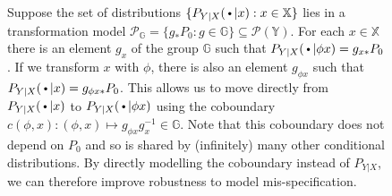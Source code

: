 \documentclass{article}
\begin{document}
\begin{figure}[h]
    \centering
    \caption{Suppose the set of distributions $\{P_{Y|X}({\,\vcenter{\hbox{\tiny$\bullet$}}\,} |x): x \in \mathbb{X}\}$ lies in a transformation model $\mathcal{P}_{\mathbb{G}} = \{g_*P_0 : g \in \mathbb{G}\} \subseteq \mathcal{P}(\mathbb{Y})$. For each $x \in \mathbb{X}$ there is an element $g_{x}$ of the group $\mathbb{G}$ such that $P_{Y|X}({\,\vcenter{\hbox{\tiny$\bullet$}}\,} |\phi x) = g_{x*}P_0$. If we transform $x$ with $\phi$, there is also an element $g_{\phi x}$ such that $P_{Y|X}({\,\vcenter{\hbox{\tiny$\bullet$}}\,}|x) = g_{\phi x*}P_0$. This allows us to move directly from $P_{Y|X}({\,\vcenter{\hbox{\tiny$\bullet$}}\,}|x)$ to $P_{Y|X}({\,\vcenter{\hbox{\tiny$\bullet$}}\,}|\phi x)$ using the coboundary $c(\phi,x): (\phi,x) \mapsto g_{\phi x}g_x^{-1} \in \mathbb{G}$. Note that this coboundary does not depend on $P_0$ and so is shared by (infinitely) many other conditional distributions. By directly modelling the coboundary instead of $P_{Y|X}$, we can therefore improve robustness to model mis-specification.}
    \label{fig:coboundary}
\end{figure}
\end{document}
